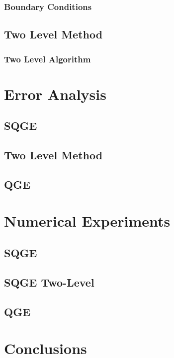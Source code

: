 \documentclass[12pt,draft]{VTthesis}
\begin{document}
      \subsection{Boundary Conditions} \label{sse:BCs}
      
    \section{Two Level Method} \label{sec:TwoLevel}
    
      \subsection{Two Level Algorithm} \label{sse:Algorithm}
      

  \chapter{Error Analysis} \label{ch:Errors}
  
    \section{SQGE} \label{sec:SQGEErrors}
    
    \section{Two Level Method} \label{sse:SQGE2LE}
    
    \section{QGE} \label{sec:QGEError}
    

  \chapter{Numerical Experiments} \label{ch:Tests}
  
    \section{SQGE} \label{sec:SQGETests}
    
    \section{SQGE Two-Level} \label{sec:SQGE2LTests}
    
    \section{QGE} \label{sec:QGETests}
    

  \chapter{Conclusions} \label{ch:Conclusions}
  

  
  

%  
\end{document}
